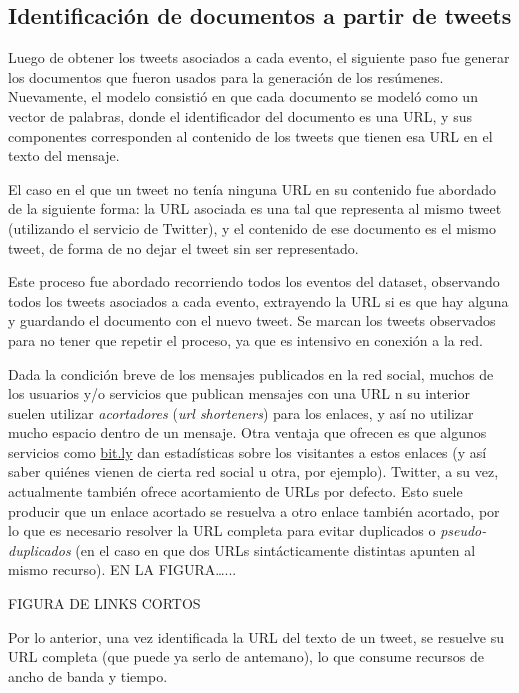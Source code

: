 \documentclass[upright, contnum]{umemoria}
\begin{document}
{\begin{itemize}
\end{itemize}
\subsection{Identificación de documentos a partir de tweets}
\label{sec-6.2.3}


    Luego de obtener los tweets asociados a cada evento, el siguiente
    paso fue generar los documentos que fueron usados para la
    generación de los resúmenes. Nuevamente, el modelo consistió en que cada
    documento se modeló como un vector de palabras, donde el
    identificador del documento es una URL, y sus componentes
    corresponden al contenido de los tweets que tienen esa URL en el
    texto del mensaje.

    El caso en el que un tweet no tenía ninguna URL en su contenido
    fue abordado de la siguiente forma: la URL asociada es una tal que
    representa al mismo tweet (utilizando el servicio de Twitter), y
    el contenido de ese documento es el mismo tweet, de forma de no
    dejar el tweet sin ser representado.

    Este proceso fue abordado recorriendo todos los eventos del
    dataset, observando todos los tweets asociados a cada evento,
    extrayendo la URL si es que hay alguna y guardando el documento
    con el nuevo tweet. Se marcan los tweets observados para no tener
    que repetir el proceso, ya que es intensivo en conexión a la red.

    Dada la condición breve de los mensajes publicados en la red
    social, muchos de los usuarios y/o servicios que publican mensajes
    con una URL n su interior suelen utilizar \emph{acortadores} (\emph{url shorteners})
    para los enlaces, y así no utilizar mucho espacio dentro de un
    mensaje. Otra ventaja que ofrecen es que algunos servicios como
    \hyperref[sec-6.2.3]{bit.ly} dan estadísticas sobre los visitantes a estos enlaces (y
    así saber quiénes vienen de cierta red social u otra, por
    ejemplo). Twitter, a su vez, actualmente también ofrece
    acortamiento de URLs por defecto. Esto suele producir que un enlace
    acortado se resuelva a otro enlace también acortado, por lo que es
    necesario resolver la URL completa para evitar duplicados o
    \emph{pseudo-duplicados} (en el caso en que dos URLs sintácticamente
    distintas apunten al mismo recurso). EN LA FIGURA\ldots{}...

    FIGURA DE LINKS CORTOS

    Por lo anterior, una vez identificada la URL del texto de un
    tweet, se resuelve su URL completa (que puede ya serlo de
    antemano), lo que consume recursos de ancho de banda y
    tiempo. 

}
\end{document}
